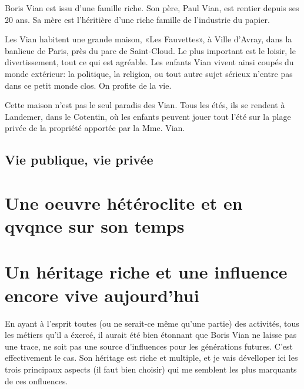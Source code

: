 \documentclass[twoside]{book}
\begin{document}
Boris Vian est issu d'une famille riche. Son père, Paul Vian, est rentier
depuis ses 20 ans. Sa mère est l'héritière d'une riche famille de l'industrie
du papier.

Les Vian habitent une grande maison, «Les Fauvettes», à Ville d'Avray, dans la
banlieue de Paris, près du parc de Saint-Cloud. Le plus important est le loisir,
le divertissement, tout ce qui est agréable. Les enfants Vian vivent ainsi coupés
du monde extérieur: la politique, la religion, ou tout autre sujet sérieux n'entre
pas dans ce petit monde clos. On profite de la vie.

Cette maison n'est pas le seul paradis des Vian. Tous les étés, ils se rendent
à Landemer, dans le Cotentin, où les enfants peuvent jouer tout l'été sur la
plage privée de la propriété apportée par la Mme. Vian. 

\subsection{Vie publique, vie privée}




\section{Une oeuvre hétéroclite et en qvqnce sur son temps}

\subsection{}

\subsection{}

\subsection{}



\section{Un héritage riche et une influence encore vive aujourd'hui}

En ayant à l'esprit toutes (ou ne serait-ce même qu'une partie) des activités,
tous les métiers qu'il a éxercé, il aurait été bien étonnant que Boris Vian ne
laisse pas une trace, ne soit pas une source d'influences pour les générations
futures.
C'est effectivement le cas. Son héritage est riche et multiple, et je vais
dévelloper ici les trois principaux aspects (il faut bien choisir) qui me semblent
les plus marquants de ces onfluences.
\end{document}
